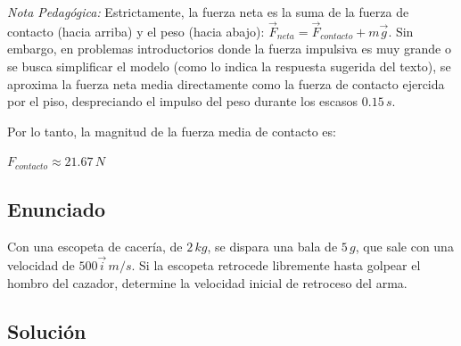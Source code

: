 \documentclass[12pt, a4paper]{article}
\begin{document}
\textit{Nota Pedagógica:} Estrictamente, la fuerza neta es la suma de la fuerza de contacto (hacia arriba) y el peso (hacia abajo): $\vec{F}_{neta} = \vec{F}_{contacto} + m\vec{g}$. Sin embargo, en problemas introductorios donde la fuerza impulsiva es muy grande o se busca simplificar el modelo (como lo indica la respuesta sugerida del texto), se aproxima la fuerza neta media directamente como la fuerza de contacto ejercida por el piso, despreciando el impulso del peso durante los escasos $0.15 \, \si{s}$.

Por lo tanto, la magnitud de la fuerza media de contacto es:

\begin{tcolorbox}[colback=green!5!white, colframe=green!50!black, title=Respuesta Final]
\centering \Large $F_{contacto} \approx 21.67 \, \si{N}$
\end{tcolorbox}

\newpage

\subsection*{Enunciado}
Con una escopeta de cacería, de $2 \, \si{kg}$, se dispara una bala de $5 \, \si{g}$, que sale con una velocidad de $500 \vec{i} \, \si{m/s}$. Si la escopeta retrocede libremente hasta golpear el hombro del cazador, determine la velocidad inicial de retroceso del arma.

\begin{center}
\end{center}

\subsection*{Solución}
\end{document}
